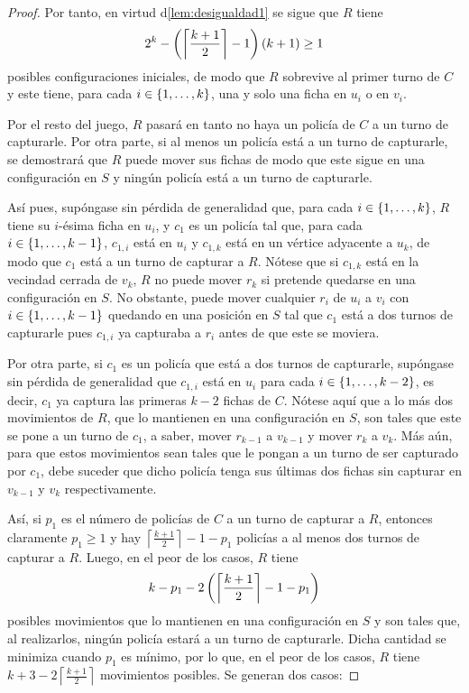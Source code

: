 \begin{proof}
    Por tanto, en virtud d\cref{lem:desigualdad1} se sigue que $R$ tiene
    \[
        2^{k} - \left( \left\lceil\frac{k+1}{2}\right\rceil - 1\right)\left( k+1\right) \geq 1
    \]
    posibles configuraciones iniciales, de modo que $R$ sobrevive al primer
    turno de $C$ y este tiene, para cada $i\in\{1,\dots, k\}$, una y solo una ficha
    en $u_i$ o en $v_i$.
    
    Por el resto del juego, $R$ pasar\'a en tanto no haya un polic\'ia de $C$ a
    un turno de capturarle. Por otra parte, si al menos un polic\'ia est\'a a un
    turno de capturarle, se demostrar\'a que $R$ puede mover sus fichas de modo
    que este sigue en una configuraci\'on en $S$ y ning\'un polic\'ia est\'a a
    un turno de capturarle.
    
    As\'i pues, sup\'ongase sin p\'erdida de generalidad que, para cada
    $i\in\{1,\dots, k\}$, $R$ tiene su $i$-\'esima ficha en $u_i$, y $c_1$ es un
    polic\'ia tal que, para cada $i\in\{1,\dots, k-1\}$, $c_{1,i}$ est\'a en $u_i$ y
    $c_{1,k}$ est\'a en un v\'ertice adyacente a $u_k$, de modo que $c_1$ est\'a
    a un turno de capturar a $R$. N\'otese que si $c_{1,k}$ est\'a en la
    vecindad cerrada de $v_k$, $R$ no puede mover $r_k$ si pretende quedarse en
    una configuraci\'on en $S$. No obstante, puede mover cualquier $r_i$ de
    $u_i$ a $v_i$ con $i\in\{1,\dots, k-1\}$ quedando en una posici\'on en $S$ tal
    que $c_1$ est\'a a dos turnos de capturarle pues $c_{1,i}$ ya capturaba a
    $r_i$ antes de que este se moviera.

    Por otra parte, si $c_1$ es un polic\'ia que est\'a a dos turnos de
    capturarle, sup\'ongase sin p\'erdida de generalidad que $c_{1,i}$ est\'a en
    $u_i$ para cada $i\in\{1,\dots, k-2\}$, es decir, $c_1$ ya captura las primeras
    $k-2$ fichas de $C$. N\'otese aqu\'i que a lo m\'as dos movimientos de $R$,
    que lo mantienen en una configuraci\'on en $S$, son tales que este se pone a
    un turno de $c_1$, a saber, mover $r_{k-1}$ a $v_{k-1}$ y mover $r_k$ a
    $v_{k}$. M\'as a\'un, para que estos movimientos sean tales que le pongan a
    un turno de ser capturado por $c_1$, debe suceder que dicho polic\'ia tenga
    sus \'ultimas dos fichas sin capturar en $v_{k-1}$ y $v_k$ respectivamente.

    As\'i, si $p_1$ es el n\'umero de polic\'ias de $C$ a un turno de capturar a
    $R$, entonces claramente $p_1 \ge 1$ y hay
    $\left\lceil\frac{k+1}{2}\right\rceil - 1 - p_1$ polic\'ias a al menos dos
    turnos de capturar a $R$. Luego, en el peor de los casos, $R$ tiene 
    \[
        k-p_1- 2\left( \left\lceil\frac{k+1}{2}\right\rceil -1 - p_1\right)
    \]
    posibles movimientos que lo mantienen en una configuraci\'on en $S$ y son
    tales que, al realizarlos, ning\'un polic\'ia estar\'a a un turno de
    capturarle. Dicha cantidad se minimiza cuando $p_1$ es m\'inimo, por lo que,
    en el peor de los casos, $R$ tiene $k + 3 -
    2\left\lceil\frac{k+1}{2}\right\rceil$ movimientos posibles. Se generan dos
    casos:


\end{proof}
